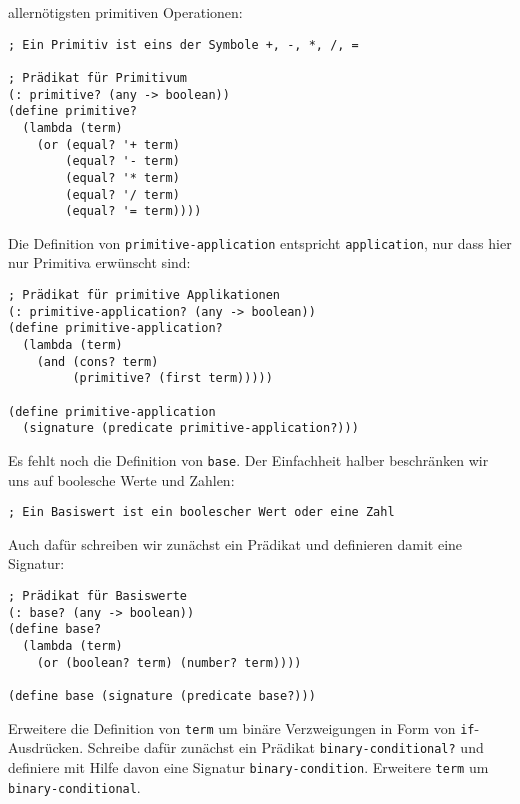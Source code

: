 allernötigsten primitiven Operationen:\label{page:primitivep}
%
\begin{lstlisting}
; Ein Primitiv ist eins der Symbole +, -, *, /, =

; Prädikat für Primitivum
(: primitive? (any -> boolean))
(define primitive?
  (lambda (term)
    (or (equal? '+ term)
        (equal? '- term)
        (equal? '* term)
        (equal? '/ term)
        (equal? '= term))))
\end{lstlisting}
%
Die Definition von \lstinline{primitive-application} entspricht
\lstinline{application}, nur dass hier nur Primitiva erwünscht sind:
%
\begin{lstlisting}
; Prädikat für primitive Applikationen
(: primitive-application? (any -> boolean))
(define primitive-application?
  (lambda (term)
    (and (cons? term)
         (primitive? (first term)))))

(define primitive-application 
  (signature (predicate primitive-application?)))
\end{lstlisting}
%
Es fehlt noch die Definition von \lstinline{base}.  Der Einfachheit
halber beschränken wir uns auf boolesche Werte und Zahlen:\label{page:basiswert}
%
\begin{lstlisting}
; Ein Basiswert ist ein boolescher Wert oder eine Zahl
\end{lstlisting}
%
Auch dafür schreiben wir zunächst ein Prädikat und definieren damit
eine Signatur:
%
\begin{lstlisting}
; Prädikat für Basiswerte
(: base? (any -> boolean))
(define base?
  (lambda (term)
    (or (boolean? term) (number? term))))

(define base (signature (predicate base?)))
\end{lstlisting}

\begin{aufgabeinline}
  Erweitere die Definition von \lstinline{term} um binäre
  Verzweigungen in Form von \lstinline{if}-Ausdrücken.  Schreibe dafür
  zunächst ein Prädikat \lstinline{binary-conditional?} und definiere
  mit Hilfe davon eine Signatur \lstinline{binary-condition}.
  Erweitere \lstinline{term} um \lstinline{binary-conditional}.
\end{aufgabeinline}

